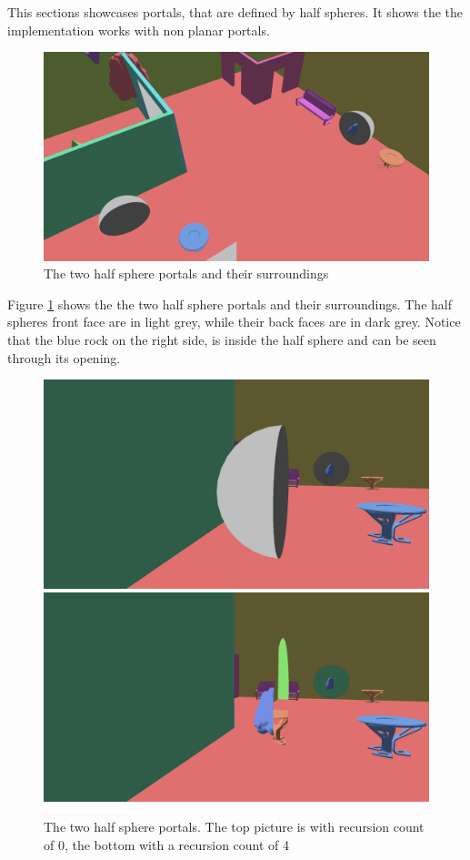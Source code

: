 This sections showcases portals, that are defined by half spheres. It shows the the implementation works with non planar portals.

\begin{figure}[H]
	\includegraphics[width=\linewidth]{images/nonplanarlayout.png}
	\caption{The two half sphere portals and their surroundings}
	\label{fig:nonplanarlayout}
\end{figure}

Figure \ref{fig:nonplanarlayout} shows the the two half sphere portals and their surroundings. The half spheres front face are in light grey, while their back faces are in dark grey. Notice that the blue rock on the right side, is inside the half sphere and can be seen through its opening.

\begin{figure}[H]
	\includegraphics[width=\linewidth]{images/NonPlanarR0.png}
	\includegraphics[width=\linewidth]{images/nonplanar.png}
	\caption{The two half sphere portals. The top picture is with recursion count of 0, the bottom with a recursion count of 4}
	\label{fig:nonplanar}
\end{figure}


